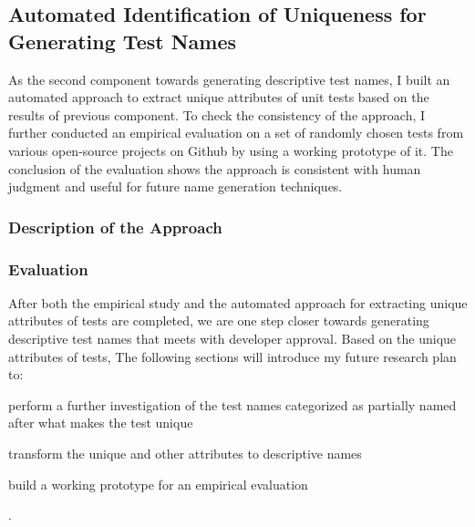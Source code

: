\subsection{Automated Identification of Uniqueness for Generating Test Names}
\label{sec:uniquness-approach}

As the second component towards generating descriptive test names, I built an automated approach to extract unique attributes of unit tests based on the results of previous component.
%
To check the consistency of the approach, I further conducted an empirical evaluation on a set of randomly chosen tests from various open-source projects on Github by using a working prototype of it.
%
The conclusion of the evaluation shows the approach is consistent with human judgment and useful for future name generation techniques.


\subsubsection{Description of the Approach}

\subsubsection{Evaluation}
\label{sec:emp-eval-attributes}


After both the empirical study and the automated approach for extracting unique attributes of tests are completed, we are one step closer towards generating descriptive test names that meets with developer approval.
%
Based on the unique attributes of tests, 
%
The following sections will introduce my future research plan to:
\begin{enumerate*}
    \item perform a further investigation of the test names categorized as partially named after what makes the test unique
    \item transform the unique and other attributes to descriptive names
    \item build a working prototype for an empirical evaluation 
\end{enumerate*}.

